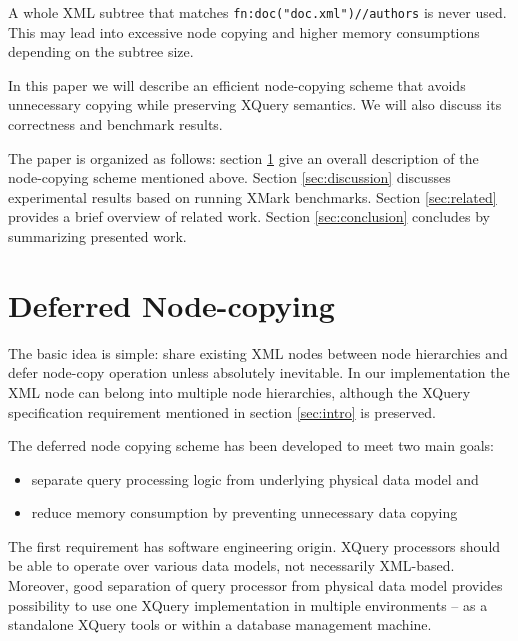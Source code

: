 \documentclass{llncs}
\begin{document}
    A whole XML subtree that matches 
    \verb|fn:doc("doc.xml")//authors| is never used. This may
    lead into excessive node copying and higher memory consumptions depending 
    on the subtree size.

    In this paper we will describe an efficient node-copying 
    scheme that avoids unnecessary copying while preserving 
    XQuery semantics. We will also discuss its correctness
    and benchmark results.

    The paper is organized as follows: section \ref{sec:deferred-copying} 
    give an overall description of the node-copying scheme mentioned above. 
    Section \ref{sec:discussion} discusses
    experimental results based on running XMark benchmarks. Section 
    \ref{sec:related} provides a brief overview of related work. 
    Section \ref{sec:conclusion} concludes by summarizing presented
    work. 
 
\section{Deferred Node-copying}
\label{sec:deferred-copying}

The basic idea is simple: share existing XML nodes between node hierarchies 
and defer node-copy operation unless absolutely inevitable. In our 
implementation the XML node can belong into multiple node hierarchies,
although the XQuery specification requirement mentioned in section
\ref{sec:intro} is preserved.

The deferred node copying scheme has been developed to meet two main goals:
\begin{itemize}
  \item separate query processing logic from underlying physical 
    data model and
  \item reduce memory consumption by preventing unnecessary data
    copying
\end{itemize}

The first requirement has software engineering origin. XQuery processors
should be able to operate over various data models, not necessarily 
XML-based. Moreover, good separation of query processor from physical
data model provides possibility to use one XQuery implementation in
multiple environments -- as a standalone XQuery tools or within a database
management machine.
\end{document}
